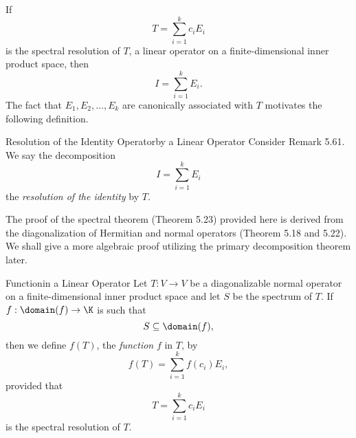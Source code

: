 \documentclass[linearalgebraII]{subfiles}
\begin{document}
    \begin{remark}
        If
        \begin{equation*}
            T = \sum^{k}_{i=1} c_iE_i
        \end{equation*}
        is the spectral resolution of $T$, a linear operator on a finite-dimensional inner product space, then
        \begin{equation*}
            I = \sum^{k}_{i=1} E_i.
        \end{equation*}
        The fact that $E_1,E_2,\ldots,E_k$ are canonically associated with $T$ motivates the following definition.
    \end{remark}

    \begin{definition}{Resolution of the Identity Operator}{by a Linear Operator}
        Consider Remark 5.61. We say the decomposition
        \begin{equation*}
            I = \sum^{k}_{i=1} E_i
        \end{equation*}
        the \emph{resolution of the identity} by $T$.
    \end{definition}

    \begin{remark}
        The proof of the spectral theorem (Theorem 5.23) provided here is derived from the diagonalization of Hermitian and normal operators (Theorem 5.18 and 5.22). We shall give a more algebraic proof utilizing the primary decomposition theorem later.
    \end{remark}

    \begin{definition}{Function}{in a Linear Operator}
        Let $T:V\to V$ be a diagonalizable normal operator on a finite-dimensional inner product space and let $S$ be the spectrum of $T$. If $f:\domain(f)\to\K$ is such that
        \begin{equation*}
            S\subseteq \domain(f),
        \end{equation*}
        then we define $f(T)$, the \emph{function} $f$ in $T$, by
        \begin{equation*}
            f(T) = \sum^{k}_{i=1} f\left( c_i \right) E_i,
        \end{equation*}
        provided that 
        \begin{equation*}
            T = \sum^{k}_{i=1} c_iE_i
        \end{equation*}
        is the spectral resolution of $T$.
    \end{definition}
\end{document}
